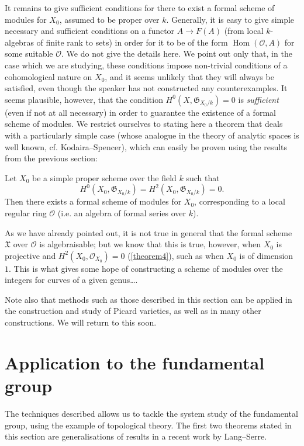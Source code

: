 \documentclass{article}
\theoremstyle{plain}
\newenvironment{theorem}[1]
  {\renewcommand\theinnercustomtheorem{#1}\innercustomtheorem}
  {\endinnercustomtheorem}
\theoremstyle{definition}
\newcommand{\sh}[1]{{\mathscr{#1}}}
\newcommand{\cat}[1]{{\mathcal{#1}}}
\newcommand{\fk}{\mathfrak}
\DeclareMathOperator{\Hom}{Hom}
\newcommand{\oldpage}[1]{\marginpar{\footnotesize$\Big\vert$ \textit{p.~#1}}}
\begin{document}
\oldpage{182-17}
It remains to give sufficient conditions for there to exist a formal scheme of modules for $X_0$, assumed to be proper over $k$.
Generally, it is easy to give simple necessary and sufficient conditions on a functor $A\to F(A)$ (from local $k$-algebras of finite rank to sets) in order for it to be of the form $\Hom(\cat{O},A)$ for some suitable $\cat{O}$.
We do not give the details here.
We point out only that, in the case which we are studying, these conditions impose non-trivial conditions of a cohomological nature on $X_0$, and it seems unlikely that they will always be satisfied, even though the speaker has not constructed any counterexamples.
It seems plausible, however, that the condition $H^0(X,\fk{G}_{X_0/k})=0$ is \emph{sufficient} (even if not at all necessary) in order to guarantee the existence of a formal scheme of modules.
We restrict ourselves to stating here a theorem that deals with a particularly simple case (whose analogue in the theory of analytic spaces is well known, cf. Kodaira--Spencer), which can easily be proven using the results from the previous section:

\begin{theorem}{10}
\label{theorem10}
  Let $X_0$ be a simple proper scheme over the field $k$ such that
  \[
    H^0(X_0,\fk{G}_{X_0/k}) = H^2(X_0,\fk{G}_{X_0/k}) = 0.
  \]
  Then there exists a formal scheme of modules for $X_0$, corresponding to a local regular ring $\cat{O}$ (i.e. an algebra of formal series over $k$).
\end{theorem}

As we have already pointed out, it is not true in general that the formal scheme $\fk{X}$ over $\cat{O}$ is algebraisable;
but we know that this is true, however, when $X_0$ is projective and $H^2(X_0,\sh{O}_{X_0})=0$ (\cref{theorem4}), such as when $X_0$ is of dimension~$1$.
This is what gives some hope of constructing a scheme of modules over the integers for curves of a given genus\ldots{}.

Note also that methods such as those described in this section can be applied in the construction and study of Picard varieties, as well as in many other constructions.
We will return to this soon.


\section{Application to the fundamental group}
\label{section8}

The techniques described allows us to tackle the system study of the fundamental group, using the example of topological theory.
The first two theorems stated in this section are generalisations of results in a recent work by Lang--Serre.
\end{document}
